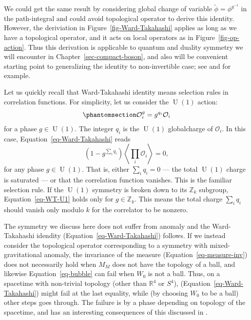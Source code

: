 \documentclass[
  letterpaper,
  DIV=11,
  numbers=noendperiod]{scrreport}
\DeclareMathOperator{\U}{U}
\begin{document}
We could get the same result by considering global change of variable
\(\widetilde{\phi} = \phi^{g^{-1}}\) in the path-integral and could
avoid topological operator to derive this identity. However, the
deriviation in Figure~\ref{fig-Ward-Takahashi} applies as long as we
have a topological operator, and it acts on local operators as in
Figure~\ref{fig-op-action}. Thus this derivation is applicable to
quantum and duality symmetry we will encounter in
Chapter~\ref{sec-compact-boson}, and also will be convenient starting
point to generalizing the identity to non-invertible case; see
\textcite{Cordova:2022ieu} and \textcite{Copetti:2023mcq} for example.

Let us quickly recall that Ward-Takahashi identity means selection rules
in correlation functions. For simplicity, let us consider the \(\U(1)\)
action: \begin{equation}\phantomsection\label{eq-WT-U1}{
\mathcal{O}_i^g = g^{q_i}\mathcal{O}_i
}\end{equation} for a phase \(g \in \U(1)\). The integer \(q_i\) is the
\(\U(1)\) globalcharge of \(\mathcal{O}_i\). In this case,
Equation~\ref{eq-Ward-Takahashi} reads \[ 
\left(1-g^{\sum_i q_i}\right)\left\langle \prod_i \mathcal{O}_i\right\rangle = 0,
\] for any phase \(g \in \U(1)\). That is, either \(\sum_i q_i =0\) ---
the total \(\U(1)\) charge is saturated --- or that the correlation
function vanishes. This is the familiar selection rule. If the \(\U(1)\)
symmetry is broken down to its \(\mathbb{Z}_k\) subgroup,
Equation~\ref{eq-WT-U1} holds only for \(g\in \mathbb{Z}_k\). This means
the total charge \(\sum_i q_i\) should vanish only modulo \(k\) for the
correlator to be nonzero.

\begin{tcolorbox}[enhanced jigsaw, opacityback=0, opacitybacktitle=0.6, leftrule=.75mm, arc=.35mm, coltitle=black, breakable, colframe=quarto-callout-tip-color-frame, titlerule=0mm, colback=white, bottomrule=.15mm, left=2mm, colbacktitle=quarto-callout-tip-color!10!white, toptitle=1mm, bottomtitle=1mm, title=\textcolor{quarto-callout-tip-color}{\faLightbulb}\hspace{0.5em}{Mixed-gravitational anomaly}, rightrule=.15mm, toprule=.15mm]

The symmetry we discuss here does not suffer from anomaly and the
Ward-Takahashi idendity (Equation~\ref{eq-Ward-Takahashi}) follows. If
we instead consider the topological operator corresponding to a symmetry
with mixed-gravitational anomaly, the invariance of the measure
(Equation~\ref{eq-measure-inv}) does not necessarily hold when \(M_M\)
does not have the topology of a ball, and likewise
Equation~\ref{eq-bubble} can fail when \(W_0\) is not a ball. Thus, on a
spacetime with non-trivial topology (other than \(\mathbb{R}^4\) or
\(S^4\)), (Equation~\ref{eq-Ward-Takahashi}) might fail at the last
equality, while (by choosing \(W_0\) to be a ball) other steps goes
through. The failure is by a phase depending on topology of the
spacetime, and has an interesting consequences of this discussed in
\autocite{Cordova:2019jqi}.

\end{tcolorbox}
\end{document}
